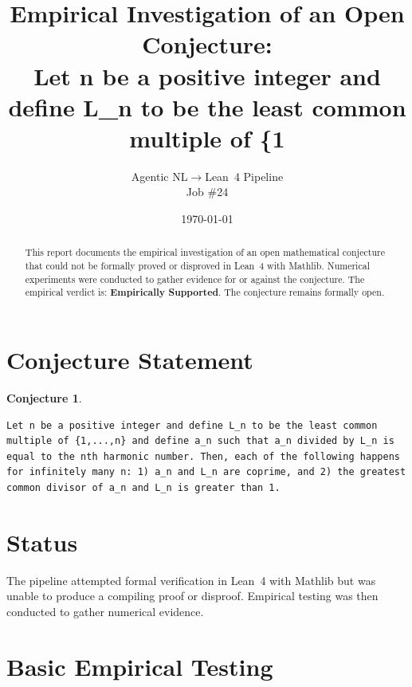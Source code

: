 \documentclass[11pt]{article}
\title{Empirical Investigation of an Open Conjecture:\\
Let n be a positive integer and define L\_n to be the least common multiple of \{1}
\author{Agentic NL$\to$Lean~4 Pipeline \\ \small Job \#24}
\date{\today}
\newtheorem{conjecture}{Conjecture}
\begin{document}
\maketitle

\begin{abstract}
This report documents the empirical investigation of an open mathematical conjecture
that could not be formally proved or disproved in Lean~4 with Mathlib.
Numerical experiments were conducted to gather evidence for or against the conjecture.
The empirical verdict is: \textbf{\textcolor{green!70!black}{Empirically Supported}}.
The conjecture remains formally open.
\end{abstract}

\section{Conjecture Statement}

\begin{conjecture}
\begin{lstlisting}
Let n be a positive integer and define L_n to be the least common multiple of {1,...,n} and define a_n such that a_n divided by L_n is equal to the nth harmonic number. Then, each of the following happens for infinitely many n: 1) a_n and L_n are coprime, and 2) the greatest common divisor of a_n and L_n is greater than 1.
\end{lstlisting}
\end{conjecture}

\section{Status}

\begin{center}
\end{center}

The pipeline attempted formal verification in Lean~4 with Mathlib but was unable to
produce a compiling proof or disproof. Empirical testing was then conducted to gather
numerical evidence.

\section{Basic Empirical Testing}
\end{document}
